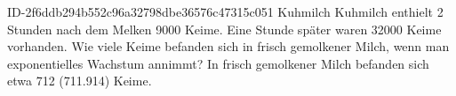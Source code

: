 \begin{exercise}
      {ID-2f6ddb294b552c96a32798dbe36576c47315c051}
      {Kuhmilch}
  \ifproblem\problem
     Kuhmilch enthielt 2 Stunden nach dem Melken \num{9000}
    Keime. Eine Stunde später waren \num{32000} Keime vorhanden. Wie
    viele Keime befanden sich in  frisch gemolkener Milch,
    wenn man exponentielles Wachstum annimmt?
  \fi
  \ifoutcome\outcome
    In  frisch gemolkener Milch befanden sich
    etwa \num{712} (\num{711.914}) Keime.
  \fi
\end{exercise}
